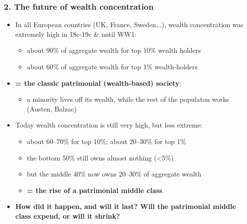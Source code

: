 \begin{frame}[label=WealthFuture]
\frametitle{2. The future of wealth concentration}
\begin{itemize}
\item
In all European countries (UK, France, Sweden...), wealth concentration was extremely high in 18c-19c \& until WW1:
\begin{itemize}
\item
about 90\% of aggregate wealth for top 10\% wealth holders
\item
about 60\% of aggregate wealth for top 1\% wealth-holders
\end{itemize}
\item
\textbf{= the classic patrimonial (wealth-based) society}: 
\begin{itemize}
\item
a minority lives off its wealth, while the rest of the populaton works (Austen, Balzac)
\end{itemize}
\item
Today wealth concentration is still very high, but less extreme:\hfill
\begin{itemize}%
\item
about 60--70\% for top 10\%; about 20--30\% for top 1\%
\item
the bottom 50\% still owns almost nothing (<5\%)
\item
but the middle 40\% now owns 20--30\% of aggregate wealth
\item
\textbf{= the rise of a patrimonial middle class}.
\end{itemize}
\item
\textbf{How did it happen, and will it last? Will the patrimonial middle class expend, or will it shrink?}
\end{itemize}
\end{frame}


